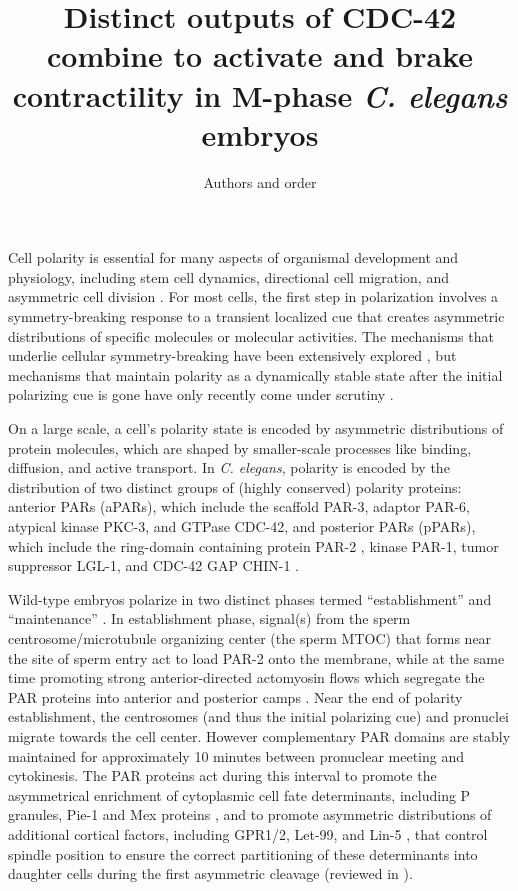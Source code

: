 \documentclass[11pt]{article}
\title{Distinct outputs of CDC-42 combine to activate and brake contractility in M-phase \emph{C. elegans} embryos }
\author{Authors and order \vspace{-0.75 cm}}
\newcommand{\6}[1]{#1_{\text{6}}}
\newcommand{\3}[1]{#1_{\text{3}}}
\begin{document}
\maketitle

Cell polarity is essential for many aspects of organismal development and physiology, including stem cell dynamics, directional cell migration, and asymmetric cell division \cite{dewey2015cell, goldstein2007proteins, ierushalmi2021cytoskeletal, maitre2016asymmetric}. For most cells, the first step in polarization involves a symmetry-breaking response to a transient localized cue that creates asymmetric distributions of specific molecules or molecular activities. The mechanisms that underlie cellular symmetry-breaking have been extensively explored \cite{li2010symmetry}, but mechanisms that maintain polarity as a dynamically stable state after the initial polarizing cue is gone have only recently come under scrutiny \cite{sailer2015dynamic, gross2019guiding}.

On a large scale, a cell's polarity state is encoded by asymmetric distributions of protein molecules, which are shaped by smaller-scale processes like binding, diffusion, and active transport. In \emph{C. elegans}, polarity is encoded by the distribution of two distinct groups of (highly conserved) polarity proteins: anterior PARs (aPARs), which include the scaffold PAR-3, adaptor PAR-6, atypical kinase PKC-3, and GTPase CDC-42, and posterior PARs (pPARs), which include the ring-domain containing protein PAR-2 \cite{bland2023optimized}, kinase PAR-1, tumor suppressor LGL-1, and CDC-42 GAP CHIN-1 \cite{lang2017proteins}. 

Wild-type embryos polarize in two distinct phases termed ``establishment'' and ``maintenance'' \cite{cuenca2003polarization}. In establishment phase, signal(s) from the sperm centrosome/microtubule organizing center (the sperm MTOC) that forms near the site of sperm entry act to load PAR-2 onto the membrane, while at the same time promoting strong anterior-directed actomyosin flows which segregate the PAR proteins into anterior and posterior camps \cite{munro2004cortical, gan2021mechanochemical}. Near the end of polarity establishment, the centrosomes (and thus the initial polarizing cue) and pronuclei migrate towards the cell center.  However complementary PAR domains are stably maintained for approximately 10 minutes between pronuclear meeting and cytokinesis. The PAR proteins act during this interval to promote the asymmetrical enrichment of cytoplasmic cell fate determinants, including P granules, Pie-1 and Mex proteins \cite{cheeks2004c, cuenca2003polarization}, and to promote asymmetric distributions of additional cortical factors, including GPR1/2, Let-99, and Lin-5 \cite{park2008dynamic, tsou2002let}, that control spindle position to ensure the correct partitioning of these determinants into daughter cells during the first asymmetric cleavage (reviewed in \cite{gonczy2005asymmetric}).
\end{document}
